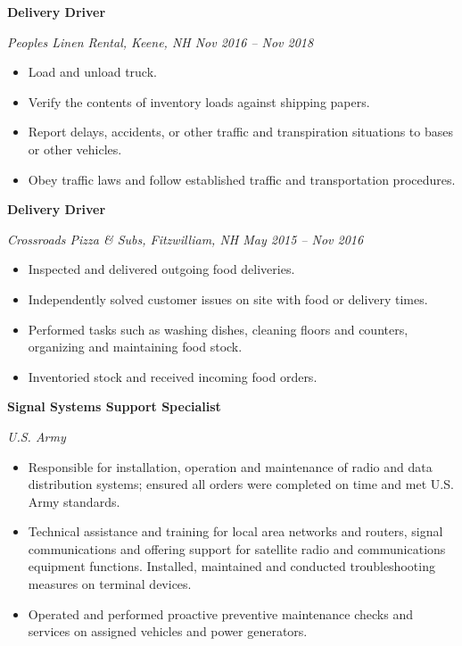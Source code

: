 \documentclass[a4ppaper, 10pt]{article}
\newcommand{\subheading}[1]{\vspace{2pt}\noindent\textbf{#1}\par}
\begin{document}
	\subheading{Delivery Driver}
	\raggedright
	\textit{Peoples Linen Rental, Keene, NH \hfill Nov 2016 -- Nov 2018}
	\begin{itemize}[itemsep=0pt, topsep=2pt]
		\item Load and unload truck.
		\item Verify the contents of inventory loads against shipping papers.
		\item Report delays, accidents, or other traffic and transpiration situations to bases or other vehicles.
		\item Obey traffic laws and follow established traffic and transportation procedures.
	\end{itemize}
	
	\subheading{Delivery Driver}
	\raggedright
	\textit{Crossroads Pizza \& Subs, Fitzwilliam, NH \hfill May 2015 -- Nov 2016}
	\begin{itemize}[itemsep=0pt, topsep=2pt]
		\item Inspected and delivered outgoing food deliveries.
		\item Independently solved customer issues on site with food or delivery times.
		\item Performed tasks such as washing dishes, cleaning floors and counters, organizing and maintaining food stock.
		\item Inventoried stock and received incoming food orders.
	\end{itemize}
	
	\subheading{Signal Systems Support Specialist}
	\raggedright
	\textit{U.S. Army}
	\begin{itemize}[itemsep=0pt, topsep=2pt]
		\item Responsible for installation, operation and maintenance of radio and data distribution systems; ensured all orders were completed on time and met U.S. Army standards.
		\item Technical assistance and training for local area networks and routers, signal communications and offering support for satellite radio and communications equipment functions. Installed, maintained and conducted troubleshooting measures on terminal devices.
		\item Operated and performed proactive preventive maintenance checks and services on assigned vehicles and power generators.
	\end{itemize}
\end{document}

